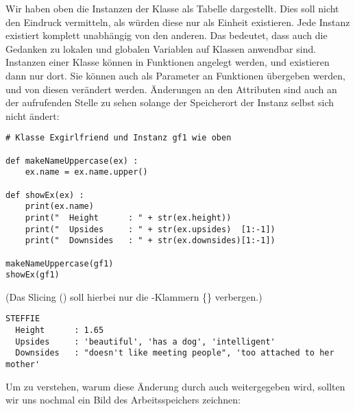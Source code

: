 Wir haben oben die Instanzen der Klasse  als Tabelle dargestellt. Dies soll nicht den Eindruck vermitteln, als würden diese nur als Einheit existieren. Jede Instanz existiert komplett unabhängig von den anderen. Das bedeutet, dass auch die Gedanken zu lokalen und globalen Variablen auf Klassen anwendbar sind. Instanzen einer Klasse können in Funktionen angelegt werden, und existieren dann nur dort. Sie können auch als Parameter an Funktionen übergeben werden, und von diesen verändert werden. Änderungen an den Attributen sind auch an der aufrufenden Stelle zu sehen solange der Speicherort der Instanz selbst sich nicht ändert:

\begin{codebox}
\begin{verbatim}
# Klasse Exgirlfriend und Instanz gf1 wie oben

def makeNameUppercase(ex) :
    ex.name = ex.name.upper()

def showEx(ex) :
    print(ex.name)
    print("  Height      : " + str(ex.height))
    print("  Upsides     : " + str(ex.upsides)  [1:-1])
    print("  Downsides   : " + str(ex.downsides)[1:-1])

makeNameUppercase(gf1)
showEx(gf1)
\end{verbatim}
\end{codebox}
(Das Slicing (\inPy{[1:-1]}) soll hierbei nur die -Klammern \{\} verbergen.)
\begin{cmdbox}
\begin{verbatim}
STEFFIE
  Height      : 1.65
  Upsides     : 'beautiful', 'has a dog', 'intelligent'
  Downsides   : "doesn't like meeting people", 'too attached to her mother'
\end{verbatim}
\end{cmdbox}

Um zu verstehen, warum diese Änderung durch  auch weitergegeben wird, sollten wir uns nochmal ein Bild des Arbeitsspeichers zeichnen:

